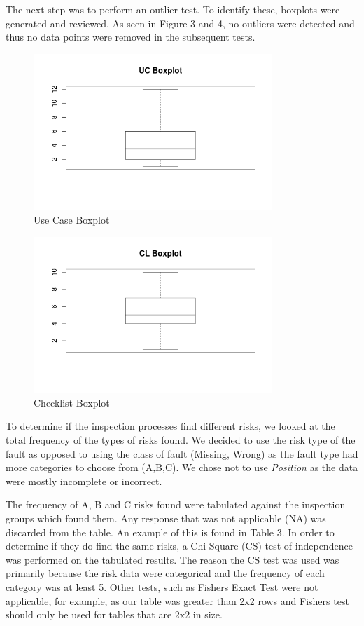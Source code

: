 \documentclass[10pt,twocolumn]{article}
\begin{document}
The next step was to perform an outlier test. To identify these, boxplots were generated and reviewed. As seen in Figure 3 and 4, no outliers were detected and thus no data points were removed in the subsequent tests. 

\begin{figure}[ht]
\centering
\includegraphics[width=90mm]{uc_box.png}
\caption{Use Case Boxplot}
\end{figure}

\begin{figure}[ht]
\centering
\includegraphics[width=90mm]{cl_box.png}
\caption{Checklist Boxplot}
\end{figure}




To determine if the inspection processes find different risks, we looked at the total frequency of the types of risks found. We decided to use the risk type of the fault as opposed to using the class of fault (Missing, Wrong) as the fault type had more categories to choose from (A,B,C). We chose not to use \textit{Position} as the data were mostly incomplete or incorrect.

The frequency of A, B and C risks found were tabulated against the inspection groups which found them. Any response that was not applicable (NA) was discarded from the table. An example of this is found in Table 3. In order to determine if they do find the same risks, a Chi-Square (CS) test of independence was performed on the tabulated results. The reason the CS test was used was primarily because the risk data were categorical and the frequency of each category was at least 5. Other tests, such as Fishers Exact Test were not applicable, for example, as our table was greater than 2x2 rows and Fishers test should only be used for tables that are 2x2 in size.
\end{document}
